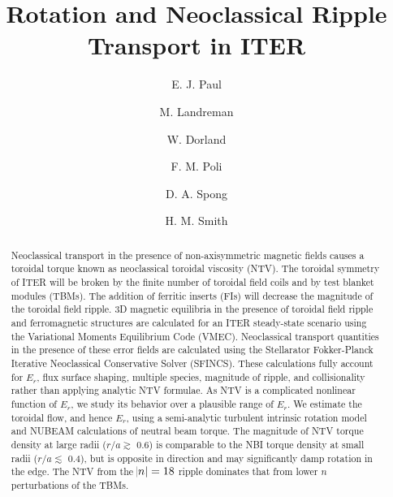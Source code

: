 \documentclass[aip, pop, preprint]{revtex4-1}
\numberwithin{figure}{section}
\numberwithin{equation}{section}
\begin{document}
\title{Rotation and Neoclassical Ripple Transport in ITER}
\author{E. J. Paul}

\author{M. Landreman}

\author{W. Dorland}

\author{F. M. Poli}

\author{D. A. Spong}

\author{H. M. Smith}

\begin{abstract}

Neoclassical transport in the presence of non-axisymmetric magnetic fields causes a toroidal torque known as neoclassical toroidal viscosity (NTV). The toroidal symmetry of ITER will be broken by the finite number of toroidal field coils and by test blanket modules (TBMs). The addition of ferritic inserts (FIs) will decrease the magnitude of the toroidal field ripple. 3D magnetic equilibria in the presence of toroidal field ripple and ferromagnetic structures are calculated for an ITER steady-state scenario using the Variational Moments Equilibrium Code (VMEC). Neoclassical transport quantities in the presence of these error fields are calculated using the Stellarator Fokker-Planck Iterative Neoclassical Conservative Solver (SFINCS). These calculations fully account for $E_r$, flux surface shaping, multiple species, magnitude of ripple, and collisionality rather than applying analytic NTV formulae. As NTV is a complicated nonlinear function of $E_r$, we study its behavior over a plausible range of $E_r$. We estimate the toroidal flow, and hence $E_r$, using a semi-analytic turbulent intrinsic rotation model and NUBEAM calculations of neutral beam torque. The magnitude of NTV torque density at large radii ($r/a \gtrsim$ 0.6) is comparable to the NBI torque density at small radii ($r/a \lesssim$ 0.4), but is opposite in direction and may significantly damp rotation in the edge. The NTV from the $\abs{n} = 18$ ripple dominates that from lower $n$ perturbations of the TBMs. 
\end{abstract}
\end{document}
